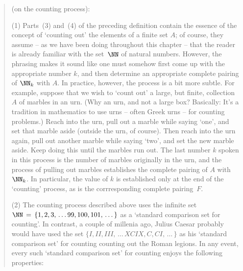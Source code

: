 {\V

\begin{quotation}
{\footnotesize \underline{\Notes} (on the counting process):
    
        (1) Parts~(3) and~(4) of the preceding definition contain the essence of the concept of `counting out' the elements of a finite set $A$;
    of course, they assume -- as we have been doing throughout this chapter -- that the reader is already familiar with the set~${\NN}$ of natural numbers.
    However, the phrasing makes it sound like one must somehow first come up with the appropriate number $k$,
    and then determine an appropriate complete pairing of ${\NN}_{k}$ with $A$.
    In practice, however, the process is a bit more subtle.
    For example, suppose that we wish to `count out' a large, but finite, collection $A$ of marbles in an urn.
    (Why an urn, and not a large box? Basically: It's a tradition in mathematics to use urns -- often Greek urns -- for counting problems.)
    Reach into the urn, pull out a marble while saying `one', and set that marble aside (outside the urn, of course).
    Then reach into the urn again, pull out another marble while saying `two', and set the new marble aside.
    Keep doing this until the marbles run out.
    The last number $k$ spoken in this process is the number of marbles originally in the urn,
    and the process of pulling out marbles establishes the complete pairing of $A$ with ${\NN}_{k}$.
    In particular, the value of $k$ is established only at the end of the `counting' process, as is the corrresponding complete pairing~$F$.

\V

        (2) The counting process described above uses the infinite set ${\NN} \,=\, \{1,2,3,\,{\ldots}\,99, 100, 101,\,{\ldots}\,\}$ as a `standard comparison set for counting'.
    In contrast, a couple of millenia ago, Julius Caesar probably would have used the set $\{I, II, III, \,{\ldots}\, XCIX, C, CI, \,{\ldots}\,\}$ as his `standard comparison set' for counting counting out the Roman legions.
    In any event, every such `standard comparison set' for counting enjoys the following properties:

}
\end{quotation}}
